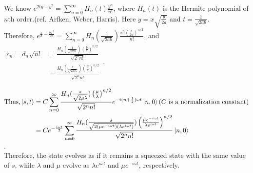 \documentclass[12pt, twoside]{article}
\begin{document}
We know $e^{2ty -y^2} = \sum _ { n = 0 } ^ { \infty } H _ { n } ( t ) \frac { y ^ { n } } { n ! }$, where $H_n(t)$ is the Hermite polynomial of $n$th order.(ref. Arfken, Weber, Harris). Here $y = x \sqrt{\frac{b}{2a}}$ and $t = \frac{1}{\sqrt{2ab}}$. \\ Therefore, $e^{\frac{x}{a} - \frac{bx^2}{2a}} = \sum _ { n = 0 } ^ { \infty } H _ { n }( \frac{1}{\sqrt { 2 a b } }) \frac {x ^ { n } \left( \frac { b } { 2 a } \right) ^ { n / 2 } } { n ! }$, and \\$\begin{aligned}c_n = d_n \sqrt{n!} &= \frac{ H_n ( \frac { 1 } { \sqrt { 2 a b } }) \left( \frac { b } { a } \right) ^ { n / 2 }}{\sqrt{2^n n!}}\\ &=\frac{ H_n ( \frac { s } { \sqrt { 2 \mu \lambda } }) \left( \frac { \mu } { \lambda } \right) ^ { n / 2 }}{\sqrt{2^n n!}}\end{aligned}$.

$\begin{aligned}\text{Thus,}\ket{s,t} &= C \sum _ { n = 0 } ^ { \infty } \frac{ H_n ( \frac { s } { \sqrt { 2 \mu \lambda } }) \left( \frac { \mu } { \lambda } \right) ^ { n / 2 }}{\sqrt{2^n n!}} e^{-i(n+\frac{1}{2})\omega t}\ket{n,0} (C \text{ is a normalization constant}) \\ &= C e^{-\frac{i\omega t}{2}}\sum _ { n = 0 } ^ { \infty } \frac{ H_n ( \frac { s } { \sqrt { 2 (\mu e^{-i\omega t}) (\lambda e^{i\omega t}) } }) \left( \frac { \mu e^{-i\omega t}} { \lambda e^{i\omega t} } \right) ^ { n / 2 }}{\sqrt{2^n n!}}\ket{n,0} \end{aligned}$.\\ Therefore, the state evolves as if it remains a squeezed state with the same value of $s$, while $\lambda$ and $\mu$ evolve as $ \lambda e^{i\omega t}$ and $\mu e^{-i\omega t}$, respectively.
\end{document}

